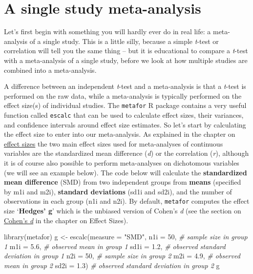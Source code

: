 \documentclass[
  oneside]{book}
\newenvironment{Shaded}{\begin{snugshade}}{\end{snugshade}}
\newcommand{\AttributeTok}[1]{\textcolor[rgb]{0.77,0.63,0.00}{#1}}
\newcommand{\CommentTok}[1]{\textcolor[rgb]{0.56,0.35,0.01}{\textit{#1}}}
\newcommand{\DecValTok}[1]{\textcolor[rgb]{0.00,0.00,0.81}{#1}}
\newcommand{\FloatTok}[1]{\textcolor[rgb]{0.00,0.00,0.81}{#1}}
\newcommand{\FunctionTok}[1]{\textcolor[rgb]{0.00,0.00,0.00}{#1}}
\newcommand{\NormalTok}[1]{#1}
\newcommand{\OtherTok}[1]{\textcolor[rgb]{0.56,0.35,0.01}{#1}}
\newcommand{\StringTok}[1]{\textcolor[rgb]{0.31,0.60,0.02}{#1}}
\begin{document}
\hypertarget{a-single-study-meta-analysis}{%
\section{A single study meta-analysis}\label{a-single-study-meta-analysis}}

Let's first begin with something you will hardly ever do in real life: a meta-analysis of a single study. This is a little silly, because a simple \emph{t}-test or correlation will tell you the same thing -- but it is educational to compare a \emph{t}-test with a meta-analysis of a single study, before we look at how multiple studies are combined into a meta-analysis.

A difference between an independent \emph{t}-test and a meta-analysis is that a \emph{t}-test is performed on the raw data, while a meta-analysis is typically performed on the effect size(s) of individual studies. The \texttt{metafor} R package contains a very useful function called \texttt{escalc} that can be used to calculate effect sizes, their variances, and confidence intervals around effect size estimates. So let's start by calculating the effect size to enter into our meta-analysis. As explained in the chapter on \protect\hyperlink{effectsize}{effect sizes} the two main effect sizes used for meta-analyses of continuous variables are the standardized mean difference (\emph{d}) or the correlation (\emph{r}), although it is of course also possible to perform meta-analyses on dichotomous variables (we will see an example below). The code below will calculate the \textbf{standardized mean difference} (SMD) from two independent groups from \textbf{means} (specified by m1i and m2i), \textbf{standard deviations} (sd1i and sd2i), and the number of observations in each group (n1i and n2i). By default, \texttt{metafor} computes the effect size `\textbf{Hedges' g}' which is the unbiased version of Cohen's \emph{d} (see the section on \protect\hyperlink{cohend}{Cohen's \emph{d}} in the chapter on Effect Sizes).

\begin{Shaded}
\begin{Highlighting}[]
\FunctionTok{library}\NormalTok{(metafor)}
\NormalTok{g }\OtherTok{\textless{}{-}} \FunctionTok{escalc}\NormalTok{(}\AttributeTok{measure =} \StringTok{"SMD"}\NormalTok{,}
            \AttributeTok{n1i =} \DecValTok{50}\NormalTok{, }\CommentTok{\# sample size in group 1}
            \AttributeTok{m1i =} \FloatTok{5.6}\NormalTok{, }\CommentTok{\# observed mean in group 1}
            \AttributeTok{sd1i =} \FloatTok{1.2}\NormalTok{, }\CommentTok{\# observed standard deviation in group 1}
            \AttributeTok{n2i =} \DecValTok{50}\NormalTok{, }\CommentTok{\# sample size in group 2}
            \AttributeTok{m2i =} \FloatTok{4.9}\NormalTok{, }\CommentTok{\# observed mean in group 2}
            \AttributeTok{sd2i =} \FloatTok{1.3}\NormalTok{) }\CommentTok{\# observed standard deviation in group 2}
\NormalTok{g}
\end{Highlighting}
\end{Shaded}
\end{document}
